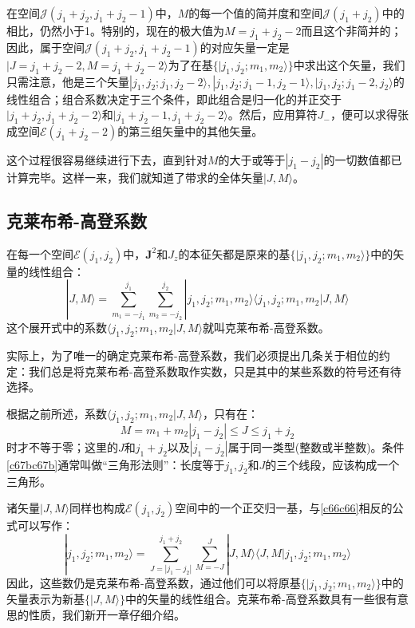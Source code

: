 \documentclass[]{article}
\begin{document}
在空间$\mathscr{J}(j_1+j_2,j_1+j_2-1)$中，$M$的每一个值的简并度和空间$\mathscr{J}(j_1+j_2)$中的相比，仍然小于1。特别的，现在的极大值为$M=j_1+j_2-2$而且这个非简并的；因此，属于空间$\mathscr{J}(j_1+j_2,j_1+j_2-1)$的对应矢量一定是$|J=j_1+j_2-2,M=j_1+j_2-2\rangle$为了在基$\{|j_1,j_2;m_1,m_2\rangle\}$中求出这个矢量，我们只需注意，他是三个矢量$|j_1,j_2;j_1,j_2-2\rangle,|j_1,j_2;j_1-1,j_2-1\rangle,|j_1,j_2;j_1-2,j_2\rangle$的线性组合；组合系数决定于三个条件，即此组合是归一化的并正交于$|j_1+j_2,j_1+j_2-2\rangle$和$|j_1+j_2-1,j_1+j_2-2\rangle$。然后，应用算符$J_-$，便可以求得张成空间$\mathscr{E}(j_1+j_2-2)$的第三组矢量中的其他矢量。\par 
这个过程很容易继续进行下去，直到针对$M$的大于或等于$|j_1-j_2|$的一切数值都已计算完毕。这样一来，我们就知道了带求的全体矢量$|J,M\rangle$。
\subsection{克莱布希-高登系数}
在每一个空间$\mathscr{E}(j_1,j_2)$中，$\boldsymbol{J}^2$和$J_{z}$的本征矢都是原来的基$\{|j_1,j_2;m_1,m_2\rangle\}$中的矢量的线性组合：
\begin{equation}
	|J,M\rangle=\sum\limits_{m_1=-j_1}^{j_1}\sum\limits_{m_2=-j_2}^{j_2}|j_1,j_2;m_1,m_2\rangle\langle j_1,j_2;m_1,m_2|J,M\rangle
	\label{c66c66}
\end{equation}
这个展开式中的系数$\langle j_1,j_2;m_1,m_2|J,M\rangle$就叫克莱布希-高登系数。\par 
实际上，为了唯一的确定克莱布希-高登系数，我们必须提出几条关于相位的约定：我们总是将克莱布希-高登系数取作实数，只是其中的某些系数的符号还有待选择。\par 
根据之前所述，系数$\langle j_1,j_2;m_1,m_2|J,M\rangle$，只有在：
\begin{subequations}
	\begin{equation}
		M=m_1+m_2
	\end{equation}
	\begin{equation}
		|j_1-j_2|\leqslant J \leqslant j_1+j_2
		\label{c67bc67b}
	\end{equation}
\end{subequations}
时才不等于零；这里的$J$和$j_1+j_2$以及$|j_1-j_2|$属于同一类型(整数或半整数)。条件\eqref{c67bc67b}通常叫做“三角形法则”：长度等于$j_1,j_2$和$J$的三个线段，应该构成一个三角形。\par 
诸矢量$|J,M\rangle$同样也构成$\mathscr{E}(j_1,j_2)$空间中的一个正交归一基，与\eqref{c66c66}相反的公式可以写作：
\begin{equation}
	|j_1,j_2;m_1,m_2\rangle=\sum\limits_{J=|j_1-j_2|}^{j_1+j_2}\sum\limits_{M=-J}^{J}|J,M\rangle\langle J,M|j_1,j_2;m_1,m_2\rangle
\end{equation}
因此，这些数仍是克莱布希-高登系数，通过他们可以将原基$\{|j_1,j_2;m_1,m_2\rangle\}$中的矢量表示为新基$\{|J,M\rangle\}$中的矢量的线性组合。克莱布希-高登系数具有一些很有意思的性质，我们新开一章仔细介绍。
\end{document}
